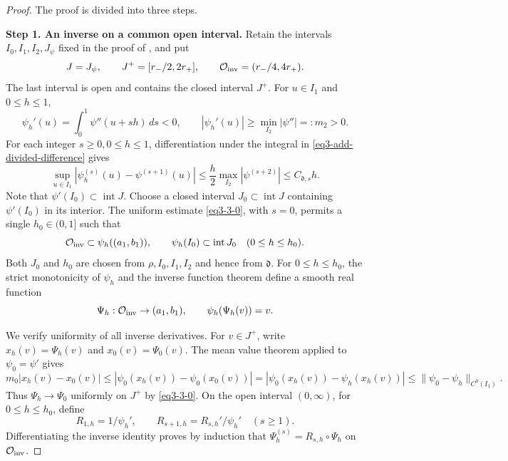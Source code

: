 \documentclass[reqno,12pt]{amsart}
\numberwithin{equation}{section}
\begin{document}
\begin{proof}
The proof is divided into three steps.

\medskip
\noindent\textbf{Step 1. An inverse on a common open interval.}
Retain the intervals $I_0,I_1,I_2,J_\psi$ fixed in the proof of
, and put
\[
 J=J_\psi,\qquad J^+=[r_-/2,2r_+],\qquad
 \mathcal O_{\rm inv}=(r_-/4,4r_+).
\]
The last interval is open and contains the closed interval $J^+$.
For $u\in I_1$ and $0\le h\le1$,
\[
 \psi_h'(u)=\int_0^1\psi''(u+sh)\,ds<0,\qquad
 |\psi_h'(u)|\ge\min_{I_2}|\psi''|=:m_2>0.
\]
For each integer $s\ge0,0\le h\le 1$, differentiation under the integral in
\eqref{eq3-add-divided-difference} gives
\begin{equation}\label{eq3-3-0}
	\sup_{u\in I_1}|\psi_h^{(s)}(u)-\psi^{(s+1)}(u)|
	\le\frac h2\max_{I_2}|\psi^{(s+2)}|
	\le C_{\mathfrak d,s}h.
\end{equation}
Note that $\psi'(I_0)\subset\operatorname{int}J$.
Choose a closed interval $J_0\subset\operatorname{int}J$ containing
$\psi'(I_0)$ in its interior. The uniform estimate \eqref{eq3-3-0}, with $s=0$,
permits a single $h_0\in(0,1]$ such that
\[
 \mathcal O_{\rm inv}\subset\psi_h((a_1,b_1)),\qquad
 \psi_h(I_0)\subset\operatorname{int}J_0
                                \quad(0\le h\le h_0).
\]
Both $J_0$ and $h_0$ are chosen from $\rho,I_0,I_1,I_2$ and hence
from $\mathfrak d$. For $0\le h\le h_0$, the strict monotonicity of $\psi_h$ and the inverse function
theorem define a smooth real function
\[
 \Psi_h:\mathcal O_{\rm inv}\to(a_1,b_1),\qquad
 \psi_h(\Psi_h(v))=v.
\]

We verify uniformity of all inverse derivatives. For $v\in J^+$,
write $x_h(v)=\Psi_h(v)$ and $x_0(v)=\Psi_0(v)$. The mean value
theorem applied to $\psi_0=\psi'$ gives
\[
 m_0|x_h(v)-x_0(v)|
 \le|\psi_0(x_h(v))-\psi_0(x_0(v))|
 =|\psi_0(x_h(v))-\psi_h(x_h(v))|
 \le\|\psi_0-\psi_h\|_{C^0(I_1)}.
\]
Thus $\Psi_h\to\Psi_0$ uniformly on $J^+$ by \eqref{eq3-3-0}.
On the open interval $(0,\infty)$, for $0\le h\le h_0$, define
\[
 R_{1,h}=1/\psi_h',\qquad R_{s+1,h}=R_{s,h}'/\psi_h'\quad(s\ge1).
\]
Differentiating the inverse identity proves by induction that
$\Psi_h^{(s)}=R_{s,h}\circ\Psi_h$ on $\mathcal O_{\rm inv}$.


\end{proof}
\end{document}
